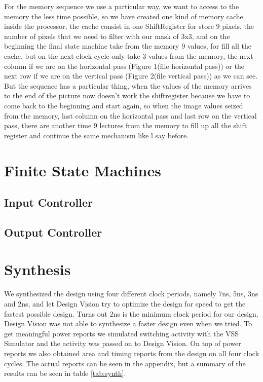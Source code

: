 \documentclass[11pt,a4paper]{article}
\begin{document}
For the memory sequence we use a particular way, we want to access to the memory the less time possible, so we have created one kind of memory cache inside the processor, the cache consist in one ShiftRegister for store 9 pixels, the number of pixels that we need to filter with our mask of 3x3, and on the beginning the final state machine take from the memory 9 values, for fill all the cache, but on the next clock cycle only take 3 values from the memory, the next column if we are on the horizontal pass (Figure 1(file horizontal pass)) or the next row if we are on the vertical pass (Figure 2(file vertical pass)) as we can see. But the sequence has a particular thing, when the values of the memory arrives to the end of the picture now doesn't work the shiftregister because we have to come back to the beginning and start again, so when the image values seized from the memory, last column on the horizontal pass and last row on the vertical pass, there are another time 9 lectures from the memory to fill up all the shift register and continue the same mechanism like l say before.


\section{Finite State Machines}
\subsection{Input Controller}

\subsection{Output Controller}


\FloatBarrier
\section{Synthesis}
We synthesized the design using four different clock periods, namely 7ns, 5ns, 3ns and 2ns, and let Design Vision try to optimize the design for speed to get the fastest possible design. Turns out 2ns is the minimum clock period for our design, Design Vision was not able to synthesize a faster design even when we tried. To get meaningful power reports we simulated switching activity with the VSS Simulator and the activity was passed on to Design Vision. On top of power reports we also obtained area and timing reports from the design on all four clock cycles. The actual reports can be seen in the appendix, but a summary of the results can be seen in table \ref{tab:synth}.
\end{document}
